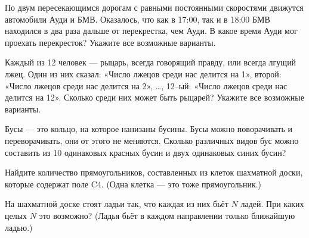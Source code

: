  По двум пересекающимся дорогам с равными постоянными скоростями движутся автомобили Ауди и БМВ. Оказалось, что как в 17:00, так и в 18:00 БМВ находился в два раза дальше от перекрестка, чем Ауди. В какое время Ауди мог проехать перекресток? Укажите все возможные варианты.


Каждый из 12 человек — рыцарь, всегда говорящий правду, или всегда лгущий лжец. Один из них сказал: «Число лжецов среди нас делится на 1», второй: «Число лжецов среди нас делится на 2», …, 12–ый: «Число лжецов среди нас делится на 12». Сколько среди них может быть рыцарей? Укажите все возможные варианты.


Бусы — это кольцо, на которое нанизаны бусины. Бусы можно поворачивать и переворачивать, они от этого не меняются. Сколько различных видов бус можно составить из 10 одинаковых красных бусин и двух одинаковых синих бусин?


Найдите количество прямоугольников, составленных из клеток шахматной доски, которые содержат поле C4. (Одна клетка — это тоже прямоугольник.)



На шахматной доске стоят ладьи так, что каждая из них бьёт $N$ ладей. При каких целых $N$ это возможно? (Ладья бьёт в каждом направлении только ближайшую ладью.) 


